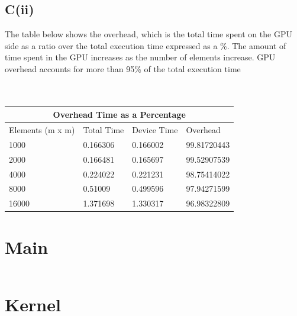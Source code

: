 \documentclass{article}
\begin{document}
\subsection{C(ii)}
\setlength{\parindent}{0cm}
\setlength{\parskip}{1em}
The table below shows the overhead, which is the total time spent on the GPU side as a ratio over the total execution time expressed as a \%. The amount of time spent in the GPU increases as the number of elements increase. GPU overhead accounts for more than 95\% of the total execution time
\\
\\
\\
 \setlength{\parindent}{1cm}
 \begin{tabular}{|p{3cm}||p{3cm}|p{3cm}|p{3cm}|}
 \hline
 \multicolumn{4}{|c|}{Overhead Time as a Percentage}\\
 \hline
 Elements (m x m) & Total Time & Device Time & Overhead \\
 \hline
 1000 & 0.166306 & 0.166002 & 99.81720443\\
 \hline
 2000 & 0.166481 & 0.165697 & 99.52907539\\
 \hline
 4000 & 0.224022 & 0.221231 & 98.75414022\\
 \hline
 8000 & 0.51009 & 0.499596 & 97.94271599\\
 \hline
 16000 & 1.371698 & 1.330317 & 96.98322809\\
 \hline
 \end{tabular}


\section{Main}
\inputminted[breaklines, linenos]{c}{./main.cu}

\section{Kernel}
\inputminted[breaklines, linenos]{c}{./kernel.cu}
\end{document}
